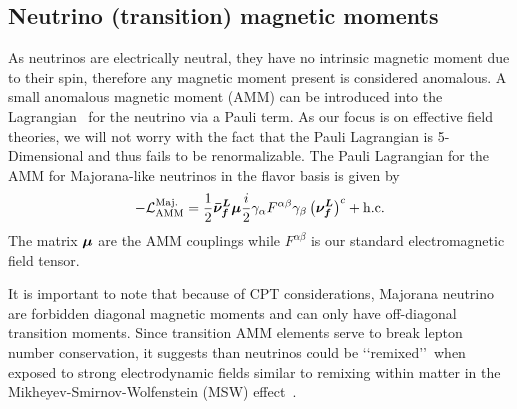 \subsection{Neutrino (transition) magnetic moments}
\label{sec:numoment}
\noindent As neutrinos are electrically neutral, they have no intrinsic magnetic moment due to their spin, therefore any magnetic moment present is considered anomalous. A small anomalous magnetic moment (AMM) can be introduced into the Lagrangian~\citep{Itzykson:1980rh,Steinmetz:2018ryf} for the neutrino via a Pauli term. As our focus is on effective field theories, we will not worry with the fact that the Pauli Lagrangian is 5-Dimensional and thus fails to be renormalizable. The Pauli Lagrangian for the AMM for Majorana-like neutrinos in the flavor basis is given by
\begin{align}
	\label{moment:1} -\mathcal{L}_{\rm{AMM}}^{\rm Maj.}=\frac{1}{2}\boldsymbol{\bar{\nu}_{f}^{L}}\boldsymbol{\mu}\frac{i}{2}\gamma_{\alpha}F^{\alpha\beta}\gamma_{\beta}\left(\boldsymbol{\nu_{f}^{L}}\right)^{c}+\rm{h.c.}
\end{align}
The matrix $\boldsymbol{\mu}$ are the AMM couplings while $F^{\alpha\beta}$ is our standard electromagnetic field tensor.

It is important to note that because of CPT considerations, Majorana neutrino are forbidden diagonal magnetic moments and can only have off-diagonal transition moments. Since transition AMM elements serve to break lepton number conservation, it suggests than neutrinos could be \lq\lq remixed\rq\rq\ when exposed to strong electrodynamic fields similar to remixing within matter in the Mikheyev-Smirnov-Wolfenstein (MSW) effect~\citep{wolfenstein1978neutrino,mikheev1985resonance,bethe1986possible,greiner2009gauge}. 

